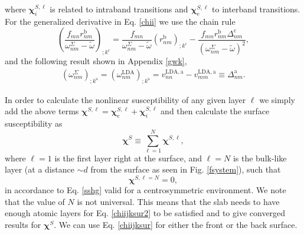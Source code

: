 where $\boldsymbol{\chi}^{S,\ell}_i$
 is related to intraband transitions and
$\boldsymbol{\chi}^{S,\ell}_e$
to interband transitions.
For the generalized derivative in Eq. \eqref{chii} we use the chain rule 
\begin{equation}\label{gene2}
\left(\frac{f_{mn}r_{nm}^{\mathrm{b}}}{\omega^\Sigma_{nm}-\tilde{\omega}}\right)_{;k^{\mathrm{c}}}=
\frac{f_{mn}}{\omega^\Sigma_{nm}-\tilde{\omega}}\left(r_{nm}^{\mathrm{b}}\right)_{;k^{\mathrm{c}}}
-\frac{f_{mn}r_{nm}^{\mathrm{b}}\Delta_{nm}^\mathrm{c}}{(\omega^\Sigma_{nm}-\tilde{\omega})^2}
,
\end{equation}
and the following result
shown in Appendix \ref{gwk},
\begin{align}\label{eli.13}
\left(\omega^\Sigma_{nm}\right)_{;k^{\mathrm{a}}}
=
\left(\omega^{\mathrm{LDA}}_{nm}\right)_{;k^{\mathrm{a}}}
= 
v_{nn}^{\mathrm{LDA},\mathrm{a}}-v_{mm}^{\mathrm{LDA},\mathrm{a}}\equiv\Delta_{nm}^{\mathrm{a}}
.
\end{align} 

In order to calculate the nonlinear susceptibility of any given layer 
$\ell$ we simply add the above terms $\boldsymbol{\chi}^{S,\ell}=
\boldsymbol{\chi}_e^{S,\ell}+\boldsymbol{\chi}_i^{S,\ell}$ and 
then calculate the surface susceptibility as 
\begin{equation}\label{chiijksur}
\boldsymbol{\chi}^S\equiv \sum_{\ell=1}^{N}\boldsymbol{\chi}^{S,\ell},
\end{equation} 
where $\ell=1$ is the first layer right at the surface, 
and $\ell=N$ is the bulk-like layer (at a distance $\sim d$ from the
surface  as seen in
Fig. \ref{fsystem}), such that 
\begin{equation}\label{chiijksur2}
\boldsymbol{\chi}^{S,\ell=N}=0,
\end{equation}
in accordance to Eq. \eqref{sshg} valid for a centrosymmetric environment. 
We note that the value of
$N$ is not universal.
This means that the slab needs to have enough atomic layers for 
Eq. \eqref{chiijksur2} 
to be satisfied and to give converged results for $\boldsymbol{\chi}^S$. 
We can use Eq. \eqref{chiijksur} for
either the front or the back surface.

